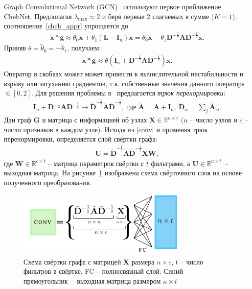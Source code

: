 \documentclass[14pt]{extarticle}
\begin{document}
Graph Convolutional Network (GCN)~\cite{kipf_semi-supervised_2017} используют первое приближение ChebNet. Предполагая $\lambda_{\max} \approx 2$ и беря первые 2 слагаемых в сумме ($K=1$), соотношение~\eqref{cheb_appr} упрощается до 
\begin{align}
\mathbf{x} * \mathbf{g} \approx \tilde{\theta}_{0} \mathbf{x}+\tilde{\theta}_{1}\left(\mathbf{L}-\mathbf{I}_{n}\right) \mathbf{x}=\tilde{\theta}_{0} \mathbf{x}-\tilde{\theta}_{1} \mathbf{D}^{-\frac{1}{2}} \mathbf{A} \mathbf{D}^{-\frac{1}{2}} \mathbf{x}.
\end{align}
Приняв $\theta = \tilde{\theta}_0  = -\tilde{\theta}_1$, получаем:
\begin{align}
\mathbf{x} * \mathbf{g}  \approx \theta\left(\mathbf{I}_{n}+\mathbf{D}^{-\frac{1}{2}} \mathbf{A} \mathbf{D}^{-\frac{1}{2}}\right) \mathbf{x}.
\label{conv}
\end{align}
Оператор в скобках может может привести к вычислительной нестабильности и взрыву или затуханию градиентов, т.к. собственные значения данного оператора $\in [0,2]$. Для решения проблемы в~\cite{kipf_semi-supervised_2017} предлагается \textit{трюк перенормировки}: 
\begin{align*}
\mathbf{I}_{n}+\mathbf{D}^{-\frac{1}{2}} \mathbf{A} \mathbf{D}^{-\frac{1}{2}} \rightarrow
\tilde{\mathbf{D}}^{-\frac{1}{2}} \tilde{\mathbf{A}}\tilde{\mathbf{D}}^{-\frac{1}{2}}, 
\text{ где }
\tilde{\mathbf{A}}=\mathbf{A}+\mathbf{I}_{n},~ \tilde{\mathbf{D}}_{i i}=\sum_{j} \tilde{\mathbf{A}}_{i j}.
\end{align*}
Дан граф $\mathbf{G}$ и матрица с информацией об узлах $\mathbf{X} \in \mathbb{R}^{n \times c}$ ($n$ -- число узлов и $c$ -- число признаков в каждом узле). Исходя из \eqref{conv} и применяя трюк перенормировки, определяется слой свёртки графа:
\begin{align}
\textbf{U}=\tilde{\mathbf{D}}^{-\frac{1}{2}} \tilde{\mathbf{A}}\tilde{\mathbf{D}}^{-\frac{1}{2}} \mathbf{X} \mathbf{W},
\label{Z_conv}
\end{align}
где $\mathbf{W} \in \mathbb{R}^{c \times t}$ – матрица параметров свёртки с $t$ фильтрами, а $\textbf{U} \in \mathbb{R}^{n \times t}$~-- выходная матрица. На рисунке~\ref{fig:convlayer} изображена схема свёрточного слоя на основе полученного преобразования.
\begin{figure}[H]
	\centering
	\includegraphics[width=0.75\textwidth]{conv_layer.pdf}
	\caption{Схема свёртки графа с матрицей $\textbf{X}$ размера $n\times c$, $\text{t}$ -- число фильтров в свёртке, FC -- полносвязный слой. Синий прямоугольник~-- выходная матрица размером $n\times t$}
	\label{fig:convlayer}
\end{figure}
\end{document}

